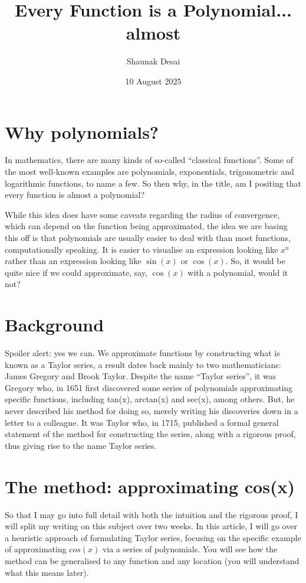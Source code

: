 \documentclass{article}
\title{Every Function is a Polynomial... almost}
\author{Shaunak Desai}
\date{10 August 2025}
\begin{document}
\maketitle
\section*{Why polynomials?}

In mathematics, there are many kinds of so-called “classical functions”. Some of the most well-known examples are polynomials, exponentials, trigonometric and logarithmic functions, to name a few. So then why, in the title, am I positing that every function is almost a polynomial?

While this idea does have some caveats regarding the radius of convergence, which can depend on the function being approximated, the idea we are basing this off is that polynomials are usually easier to deal with than most functions, computationally speaking. It is easier to visualise an expression looking like $x^n$ rather than an expression looking like $\sin(x)$ or $\cos(x)$. So, it would be quite nice if we could approximate, say, $\cos(x)$ with a polynomial, would it not?

\section*{Background}

Spoiler alert: yes we can. We approximate functions by constructing what is known as a Taylor series, a result dates back mainly to two mathematicians: James Gregory and Brook Taylor. Despite the name “Taylor series”, it was Gregory who, in 1651 first discovered some series of polynomials approximating specific functions, including tan(x), arctan(x) and sec(x), among others. But, he never described his method for doing so, merely writing his discoveries down in a letter to a colleague. It was Taylor who, in 1715, published a formal general statement of the method for constructing the series, along with a rigorous proof, thus giving rise to the name Taylor series.

\newpage
\section*{The method: approximating cos(x)}

So that I may go into full detail with both the intuition and the rigorous proof, I will split my writing on this subject over two weeks. In this article, I will go over a heuristic approach of formulating Taylor series, focusing on the specific example of approximating $cos(x)$ via a series of polynomials. You will see how the method can be generalised to any function and any location (you will understand what this means later).
\end{document}
